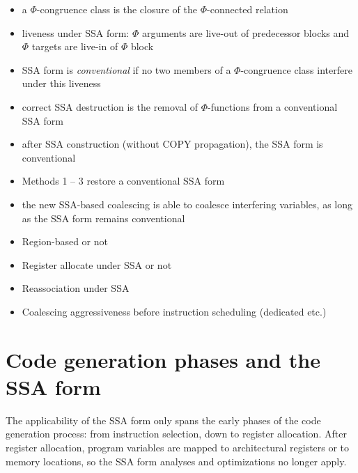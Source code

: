 \begin{itemize}

\item a $\Phi$-congruence class is the closure of the $\Phi$-connected relation

\item liveness under SSA form: $\Phi$ arguments are live-out of predecessor
blocks and $\Phi$ targets are live-in of $\Phi$ block

\item SSA form is \emph{conventional} if no two members of a $\Phi$-congruence
class interfere under this liveness

\item correct SSA destruction is the removal of $\Phi$-functions from
a conventional SSA form

\item after SSA construction (without COPY propagation), the SSA form is
conventional

\item Methods 1 -- 3 restore a conventional SSA form

\item the new SSA-based coalescing is able to coalesce interfering variables, as long
as the SSA form remains conventional

\end{itemize}


\begin{itemize}

\item Region-based or not

\item Register allocate under SSA or not

\item Reassociation under SSA

\item Coalescing aggressiveness before instruction scheduling (dedicated etc.)

\end{itemize}


\section{Code generation phases and the SSA form}
\label{sec:ssa-codegen-suitability}

The applicability of the SSA form only spans the early phases of the code
generation process: from instruction selection, down to register allocation.
After register allocation, program variables are mapped to architectural
registers or to memory locations, so the SSA form analyses and optimizations no
longer apply.

